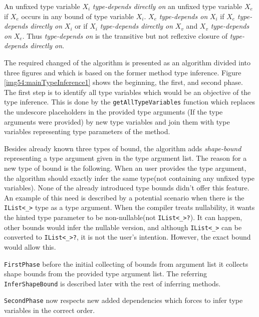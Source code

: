 \begin{defn}
An unfixed type variable \texttt{$X_i$} \textit{type-depends directly on} an unfixed type variable \texttt{$X_e$} if \texttt{$X_e$} occurs in any bound of type variable \texttt{$X_i$}.
\texttt{$X_e$} \textit{type-depends on} \texttt{$X_i$} if \texttt{$X_e$} \textit{type-depends directly on} \texttt{$X_i$} or if \texttt{$X_i$} \textit{type-depends directly on} \texttt{$X_v$} and \texttt{$X_v$} \textit{type-depends on} \texttt{$X_e$}. 
Thus \textit{type-depends on} is the transitive but not reflexive closure of \textit{type-depends directly on}.
\end{defn}
\par
The required changed of the algorithm is presented as an algorithm divided into three figures and which is based on the former method type inference.
Figure \ref{img54:mainTypeInference1} shows the beginning, the first, and second phase.
The first step is to identify all type variables which would be an objective of the type inference.
This is done by the \texttt{getAllTypeVariables} function which replaces the undescore placeholders in the provided type arguments (If the type arguments were provided) by new type variables and join them with type variables representing type parameters of the method.
\par
Besides already known three types of bound, the algorithm adds \textit{shape-bound} representing a type argument given in the type argument list.
The reason for a new type of bound is the following.
When an user provides the type argument, the algorithm should exactly infer the same type(not containing any unfixed type variables).
None of the already introduced type bounds didn't offer this feature.
An example of this need is described by a potential scenario when there is the \texttt{IList<\_>} type as a type argument.
When the compiler treats nullability, it wants the hinted type parameter to be non-nullable(not \texttt{IList<\_>?}). 
It can happen, other bounds would infer the nullable version, and although \texttt{IList<\_>} can be converted to \texttt{IList<\_>?}, it is not the user's intention.
However, the exact bound would allow this.
\par
\texttt{FirstPhase} before the initial collecting of bounds from argument list it collects shape bounds from the provided type argument list.
The referring \texttt{InferShapeBound} is described later with the rest of inferring methods.
\par
\texttt{SecondPhase} now respects new added dependencies which forces to infer type variables in the correct order.
